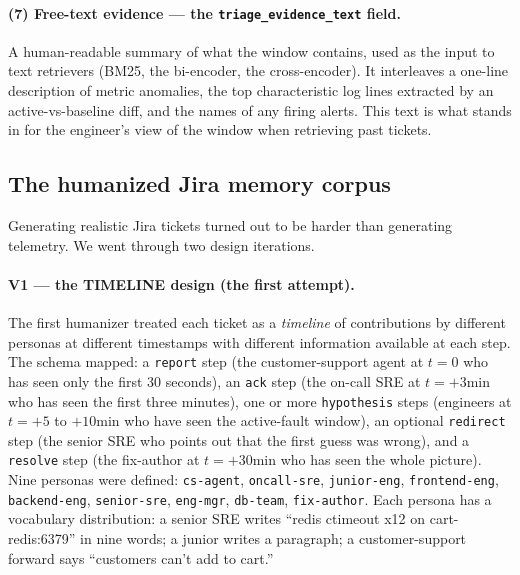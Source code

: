\paragraph{(7) Free-text evidence --- the \texttt{triage\_evidence\_text} field.}

A human-readable summary of what the window contains, used as the input to text retrievers (BM25, the bi-encoder, the cross-encoder). It interleaves a one-line description of metric anomalies, the top characteristic log lines extracted by an active-vs-baseline diff, and the names of any firing alerts. This text is what stands in for the engineer's view of the window when retrieving past tickets.

\subsection{The humanized Jira memory corpus}

Generating realistic Jira tickets turned out to be harder than generating telemetry. We went through two design iterations.

\paragraph{V1 --- the TIMELINE design (the first attempt).} The first humanizer treated each ticket as a \emph{timeline} of contributions by different personas at different timestamps with different information available at each step. The schema mapped: a \texttt{report} step (the customer-support agent at $t=0$ who has seen only the first 30 seconds), an \texttt{ack} step (the on-call SRE at $t=+3$min who has seen the first three minutes), one or more \texttt{hypothesis} steps (engineers at $t=+5$ to $+10$min who have seen the active-fault window), an optional \texttt{redirect} step (the senior SRE who points out that the first guess was wrong), and a \texttt{resolve} step (the fix-author at $t=+30$min who has seen the whole picture). Nine personas were defined: \texttt{cs-agent}, \texttt{oncall-sre}, \texttt{junior-eng}, \texttt{frontend-eng}, \texttt{backend-eng}, \texttt{senior-sre}, \texttt{eng-mgr}, \texttt{db-team}, \texttt{fix-author}. Each persona has a vocabulary distribution: a senior SRE writes ``redis ctimeout x12 on cart-redis:6379'' in nine words; a junior writes a paragraph; a customer-support forward says ``customers can't add to cart.''

